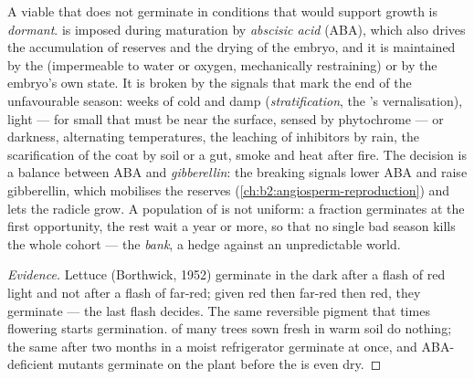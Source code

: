 \begin{definition}\label{def:b2:plant-flowering:dormancy}
A viable  that does not germinate in conditions that would
support growth is \emph{dormant}.  is imposed during 
maturation by \emph{abscisic acid} (ABA), which also drives the
accumulation of reserves and the drying of the embryo, and it is
maintained by the  (impermeable to water or oxygen,
mechanically restraining) or by the embryo's own state. It is
broken by the signals that mark the end of the unfavourable season:
weeks of cold and damp (\emph{stratification}, the 's
vernalisation), light --- for small  that must be near the
surface, sensed by phytochrome --- or darkness, alternating
temperatures, the leaching of inhibitors by rain, the scarification
of the coat by soil or a gut, smoke and heat after fire. The
decision is a balance between ABA and \emph{gibberellin}: the
breaking signals lower ABA and raise gibberellin, which mobilises
the reserves (\cref{ch:b2:angiosperm-reproduction}) and lets the
radicle grow. A population of  is not uniform: a fraction
germinates at the first opportunity, the rest wait a year or more,
so that no single bad season kills the whole cohort --- the
\emph{ bank}, a hedge against an unpredictable world.
\end{definition}
\begin{proof}[Evidence]
Lettuce  (Borthwick, 1952) germinate in the dark after a flash
of red light and not after a flash of far-red; given red then
far-red then red, they germinate --- the last flash decides. The
same reversible pigment that times flowering starts germination.
 of many trees sown fresh in warm soil do nothing; the same
 after two months in a moist refrigerator germinate at once,
and ABA-deficient mutants germinate on the plant before the  is
even dry.
\end{proof}

